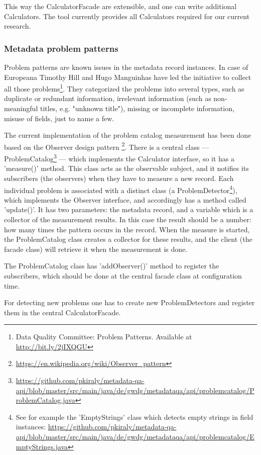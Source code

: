 This way the CalculatorFacade are extensible, and one can write additional Calculators. The tool currently provides all Calculators required for our current research.

\subsubsection{Metadata problem patterns}

Problem patterns are known issues in the metadata record instances. In case of Europeana Timothy Hill and Hugo Manguinhas have led the initiative to collect all those problems\footnote{Data Quality Committee: Problem Patterns. Available at \url{http://bit.ly/2jIXQGU}}. They categorized the problems into several types, such as duplicate or redundant information, irrelevant information (such as non-meaningful titles, e.g. "unknown title"), missing or incomplete information, misuse of fields, just to name a few.

The current implementation of the problem catalog measurement has been done based on the Observer design pattern \footnote{\url{https://en.wikipedia.org/wiki/Observer_pattern}}. There is a central class --- ProblemCatalog\footnote{\url{https://github.com/pkiraly/metadata-qa-api/blob/master/src/main/java/de/gwdg/metadataqa/api/problemcatalog/ProblemCatalog.java}} --- which implements the Calculator interface, so it has a 'measure()' method. This class acts as the observable subject, and it notifies its subscribers (the observers) when they have to measure a new record. Each individual problem is associated with a distinct class (a ProblemDetector\footnote{See for example the 'EmptyStrings' class which detects empty strings in field instances: \url{https://github.com/pkiraly/metadata-qa-api/blob/master/src/main/java/de/gwdg/metadataqa/api/problemcatalog/EmptyStrings.java}}), which implements the Observer interface, and accordingly has a method called 'update()'. It has two parameters: the metadata record, and a variable which is a collector of the measurement results. In this case the result should be a number: how many times the pattern occurs in the record. When the measure is started, the ProblemCatalog class creates a collector for these results, and the client (the facade class) will retrieve it when the measurement is done.

The ProblemCatalog class has 'addObserver()' method to register the subscribers, which should be done at the central facade class at configuration time.

For detecting new problems one has to create new ProblemDetectors and register them in the central CalculatorFacade.

